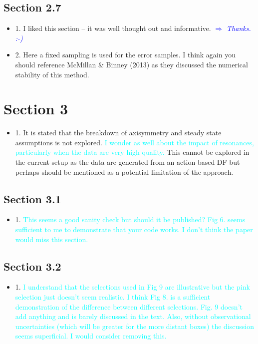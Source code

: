 \documentclass[10pt,a4paper]{article}
\newcommand{\HW}[1]{\textcolor{Cyan}{#1}}
\newcommand{\Comment}[1]{\textsl{\textcolor{Blue}{$\Longrightarrow$ {#1}}}}
\begin{document}
\subsection{Section 2.7}
\begin{itemize}
\item 1. I liked this section -- it was well thought out and informative. \Comment{Thanks. :-)}
\item 2. Here a fixed sampling is used for the error samples. I think again you should reference McMillan \& Binney (2013) as they discussed the numerical stability of this method.
\end{itemize}

\section{Section 3}
\begin{itemize}
\item 1. It is stated that the breakdown of axisymmetry and steady state assumptions is not explored. \HW{I wonder as well about the impact of resonances, particularly when the data are very high quality.} This cannot be explored in the current setup as the data are generated from an action-based DF but perhaps should be mentioned as a potential limitation of the approach.
\end{itemize}


\subsection{Section 3.1}
\begin{itemize}
\item 1. \HW{This seems a good sanity check but should it be published? Fig 6. seems sufficient to me to demonstrate that your code works. I don't think the paper would miss this section.}
\end{itemize}


\subsection{Section 3.2}
\begin{itemize}
\item 1. \HW{I understand that the selections used in Fig 9 are illustrative but the pink selection just doesn't seem realistic. I think Fig 8. is a sufficient demonstration of the difference between different selections. Fig. 9 doesn't add anything and is barely discussed in the text. Also, without observational uncertainties (which will be greater for the more distant boxes) the discussion seems superficial. I would consider removing this.}
\end{itemize}
\end{document}
